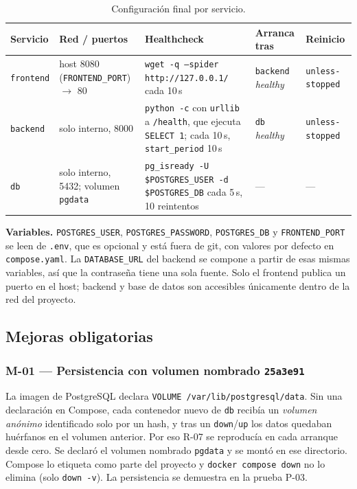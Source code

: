 \documentclass[11pt,a4paper]{article}
\newcommand{\cod}[1]{\texttt{#1}}
\begin{document}
\begin{table}[H]
\centering\small
\begin{tabularx}{\linewidth}{@{}l >{\raggedright\arraybackslash}p{2.9cm} >{\raggedright\arraybackslash}X l l@{}}
\toprule
\textbf{Servicio} & \textbf{Red / puertos} & \textbf{Healthcheck} & \textbf{Arranca tras} & \textbf{Reinicio} \\
\midrule
\cod{frontend} & host 8080 (\cod{FRONTEND\_PORT}) $\to$ 80 & \cod{wget -q --spider http://127.0.0.1/} cada 10\,s & \cod{backend} \emph{healthy} & \cod{unless-stopped} \\
\cod{backend} & solo interno, 8000 & \cod{python -c} con \cod{urllib} a \cod{/health}, que ejecuta \cod{SELECT 1}; cada 10\,s, \cod{start\_period} 10\,s & \cod{db} \emph{healthy} & \cod{unless-stopped} \\
\cod{db} & solo interno, 5432; volumen \cod{pgdata} & \cod{pg\_isready -U \$POSTGRES\_USER -d \$POSTGRES\_DB} cada 5\,s, 10 reintentos & — & — \\
\bottomrule
\end{tabularx}
\caption{Configuración final por servicio.}
\end{table}

\textbf{Variables.} \cod{POSTGRES\_USER}, \cod{POSTGRES\_PASSWORD}, \cod{POSTGRES\_DB} y \cod{FRONTEND\_PORT} se leen de \cod{.env}, que es opcional y está fuera de git, con valores por defecto en \cod{compose.yaml}. La \cod{DATABASE\_URL} del backend se compone a partir de esas mismas variables, así que la contraseña tiene una sola fuente. Solo el frontend publica un puerto en el host; backend y base de datos son accesibles únicamente dentro de la red del proyecto.

\subsection{Mejoras obligatorias}

\subsubsection*{M-01 — Persistencia con volumen nombrado \hfill{\normalfont\small\cod{25a3e91}}}

La imagen de PostgreSQL declara \cod{VOLUME /var/lib/postgresql/data}. Sin una declaración en Compose, cada contenedor nuevo de \cod{db} recibía un \emph{volumen anónimo} identificado solo por un hash, y tras un \cod{down}/\cod{up} los datos quedaban huérfanos en el volumen anterior. Por eso R-07 se reproducía en cada arranque desde cero. Se declaró el volumen nombrado \cod{pgdata} y se montó en ese directorio. Compose lo etiqueta como parte del proyecto y \cod{docker compose down} no lo elimina (solo \cod{down -v}). La persistencia se demuestra en la prueba P-03.
\end{document}
